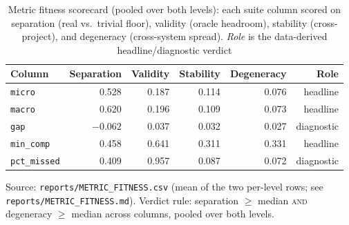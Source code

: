 \begin{table}[htbp]
  \centering
  \caption{Metric fitness scorecard (pooled over both levels): each suite column scored on separation (real vs.\ trivial floor), validity (oracle headroom), stability (cross-project), and degeneracy (cross-system spread). \emph{Role} is the data-derived headline/diagnostic verdict}
  \label{tab:metric-fitness}
  \begin{tabular}{lrrrrr}
    \toprule
    Column & Separation & Validity & Stability & Degeneracy & Role \\
    \midrule
    \texttt{micro} & 0.528 & 0.187 & 0.114 & 0.076 & headline \\
    \texttt{macro} & 0.620 & 0.196 & 0.109 & 0.073 & headline \\
    \texttt{gap} & $-0.062$ & 0.037 & 0.032 & 0.027 & diagnostic \\
    \texttt{min\_comp} & 0.458 & 0.641 & 0.311 & 0.331 & headline \\
    \texttt{pct\_missed} & 0.409 & 0.957 & 0.087 & 0.072 & diagnostic \\
    \bottomrule
  \end{tabular}
  \par\smallskip\footnotesize Source: \texttt{reports/METRIC\_FITNESS.csv} (mean of the two per-level rows; see \texttt{reports/METRIC\_FITNESS.md}). Verdict rule: separation $\geq$ median \textsc{and} degeneracy $\geq$ median across columns, pooled over both levels.
\end{table}
